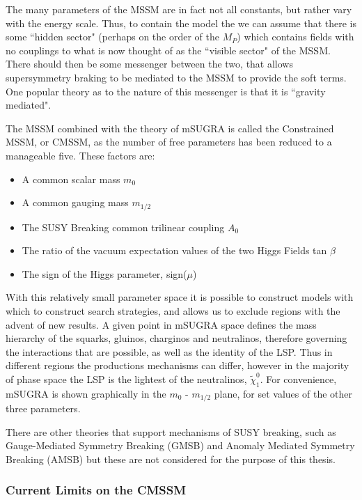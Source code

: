 The many parameters of the MSSM are in fact not all constants, but rather vary with the energy scale. Thus, to contain the model the we can assume that there is some ``hidden sector" (perhaps on the order of the $M_{P}$) which contains fields with no couplings to what is now thought of as the ``visible sector" of the MSSM. There should then be some messenger between the two, that allows supersymmetry braking to be mediated to the MSSM to provide the soft terms. One popular theory as to the nature of this messenger is that it is ``gravity mediated". 

The MSSM combined with the theory of mSUGRA is called the Constrained MSSM, or CMSSM, as the number of free parameters has been reduced to a manageable five. These factors are:

\begin{itemize}
\item{A common scalar mass $m_{0}$}
\item{A common gauging mass $m_{1/2}$}
\item{The SUSY Breaking common trilinear coupling $A_{0}$}
\item{The ratio of the vacuum expectation values of the two Higgs Fields tan $\beta$}
\item{ The sign of the Higgs parameter, sign($\mu$)}
\end{itemize} 

With this relatively small parameter space it is possible to construct models with which to construct search strategies, and allows us to exclude regions with the advent of new results. A given point in mSUGRA space defines the mass hierarchy of the squarks, gluinos, charginos and neutralinos, therefore governing the interactions that are possible, as well as the identity of the LSP. Thus in different regions the productions mechanisms can differ, however in the majority of phase space the LSP is the lightest of the neutralinos, $\tilde{\chi}^{0}_{1}$.  For convenience, mSUGRA is shown graphically in the $m_{0}$ - $m_{1/2}$ plane, for set values of the other three parameters. 

There are other theories that support mechanisms of SUSY breaking, such as Gauge-Mediated Symmetry Breaking (GMSB) and Anomaly Mediated Symmetry Breaking (AMSB) but these are not considered for the purpose of this thesis. 

\subsubsection{Current Limits on the CMSSM}

